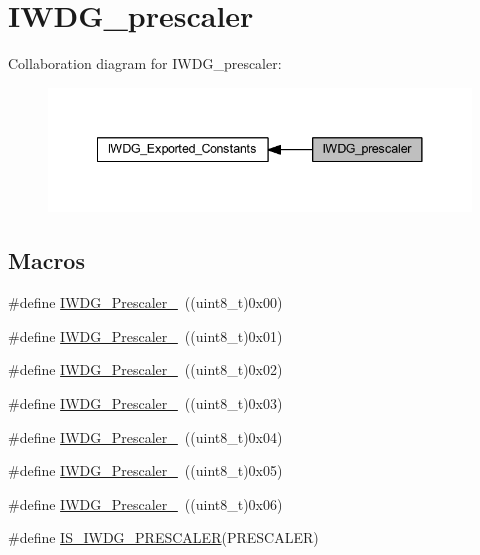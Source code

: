 \hypertarget{group___i_w_d_g__prescaler}{}\section{I\+W\+D\+G\+\_\+prescaler}
\label{group___i_w_d_g__prescaler}
Collaboration diagram for I\+W\+D\+G\+\_\+prescaler\+:
\nopagebreak
\begin{figure}[H]
\begin{center}
\leavevmode
\includegraphics[width=341pt]{group___i_w_d_g__prescaler}
\end{center}
\end{figure}
\subsection*{Macros}
\begin{DoxyCompactItemize}
\item 
\#define \hyperlink{group___i_w_d_g__prescaler_ga82a058c196d5a9cd7ea2f2202b394ba0}{I\+W\+D\+G\+\_\+\+Prescaler\+\_}~((uint8\+\_\+t)0x00)
\item 
\#define \hyperlink{group___i_w_d_g__prescaler_ga59763b9a127c67adf5d11474188996a1}{I\+W\+D\+G\+\_\+\+Prescaler\+\_}~((uint8\+\_\+t)0x01)
\item 
\#define \hyperlink{group___i_w_d_g__prescaler_gafa81d30511ff5ec74bb38ed71f5bb66e}{I\+W\+D\+G\+\_\+\+Prescaler\+\_}~((uint8\+\_\+t)0x02)
\item 
\#define \hyperlink{group___i_w_d_g__prescaler_gaa8b091b6e4102513b1e3a1c4eb6756ba}{I\+W\+D\+G\+\_\+\+Prescaler\+\_}~((uint8\+\_\+t)0x03)
\item 
\#define \hyperlink{group___i_w_d_g__prescaler_ga7ea813c73ae0acb40acb60e7d3956910}{I\+W\+D\+G\+\_\+\+Prescaler\+\_}~((uint8\+\_\+t)0x04)
\item 
\#define \hyperlink{group___i_w_d_g__prescaler_gaea6bf96c2fd5a6f3b9574e7898096641}{I\+W\+D\+G\+\_\+\+Prescaler\+\_}~((uint8\+\_\+t)0x05)
\item 
\#define \hyperlink{group___i_w_d_g__prescaler_ga7d6e918748185639049644c970db2b43}{I\+W\+D\+G\+\_\+\+Prescaler\+\_}~((uint8\+\_\+t)0x06)
\item 
\#define \hyperlink{group___i_w_d_g__prescaler_gab1e0695c1a22840d5be7c7fad283f4ba}{I\+S\+\_\+\+I\+W\+D\+G\+\_\+\+P\+R\+E\+S\+C\+A\+L\+ER}(P\+R\+E\+S\+C\+A\+L\+ER)
\end{DoxyCompactItemize}


